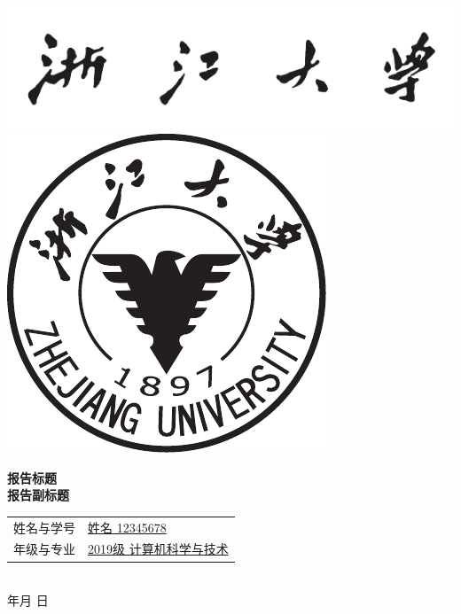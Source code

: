 \documentclass{article}
\renewcommand{\today}{\number\year 年\number\month 月 \number\day 日}
\newcommand{\mytitle}{报告标题}
\newcommand{\mysubtitle}{报告副标题}
\begin{document}
\pagestyle{empty}
\vskip 40mm
\begin{center}
    \includegraphics[width=0.65\paperwidth]{assets/zjuchar.pdf} \\
    \vskip 10mm
    \centering
    \includegraphics[width=0.3\paperwidth]{assets/zju.pdf}
\end{center}
\vskip 10mm
\begin{center}
     \textbf{\mytitle} \\
     \textbf{\mysubtitle}
\end{center}
\vskip 10mm
\begin{center}
    \begin{tabularx}{.7\textwidth}{>{\fangsong}l >{\fangsong}X<{\centering}}
        姓名与学号 & \uline{\hfill 姓名 12345678 \hfill} \\
        年级与专业 & \uline{\hfill 2019级 计算机科学与技术 \hfill} \\
    \end{tabularx}\\
    \vskip 40mm
    \today
\end{center}


\clearpage
\tableofcontents
\clearpage
\end{document}
